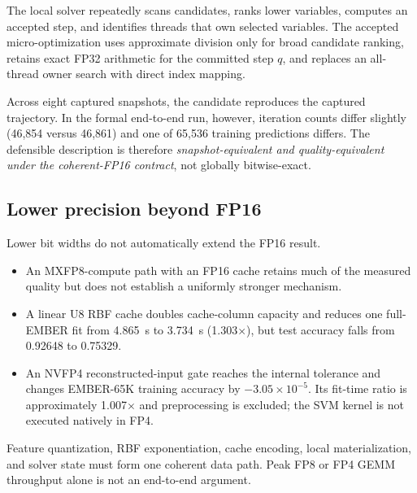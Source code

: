 The local solver repeatedly scans candidates, ranks lower variables, computes
an accepted step, and identifies threads that own selected variables. The
accepted micro-optimization uses approximate division only for broad
candidate ranking, retains exact FP32 arithmetic for the committed step $q$,
and replaces an all-thread owner search with direct index mapping.

Across eight captured snapshots, the candidate reproduces the captured
trajectory. In the formal end-to-end run, however, iteration counts differ
slightly (46,854 versus 46,861) and one of 65,536 training predictions differs.
The defensible description is therefore \emph{snapshot-equivalent and
quality-equivalent under the coherent-FP16 contract}, not globally
bitwise-exact.

\subsection{Lower precision beyond FP16}

Lower bit widths do not automatically extend the FP16 result.

\begin{itemize}
  \item An MXFP8-compute path with an FP16 cache retains much of the measured
        quality but does not establish a uniformly stronger mechanism.
  \item A linear U8 RBF cache doubles cache-column capacity and reduces one
        full-EMBER fit from \SI{4.865}{s} to \SI{3.734}{s}
        (1.303$\times$), but test accuracy falls from 0.92648 to 0.75329.
  \item An NVFP4 reconstructed-input gate reaches the internal tolerance and
        changes EMBER-65K training accuracy by $-3.05\times10^{-5}$. Its
        fit-time ratio is approximately 1.007$\times$ and preprocessing is
        excluded; the SVM kernel is not executed natively in FP4.
\end{itemize}

Feature quantization, RBF exponentiation, cache encoding, local
materialization, and solver state must form one coherent data path. Peak FP8
or FP4 GEMM throughput alone is not an end-to-end argument.
